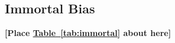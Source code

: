 \documentclass[11pt]{article}
\begin{document}
{\begin{comment}
By varying these parameters, the method computes bounds for the treatment effect and identifies breakdown point. 


\bigskip
\centerline{\bf [Place \hyperref[fig:dmp]{Figure~\ref*{fig:dmp}} about here]}
\bigskip

The point estimate is again -10.7\%. Panel (a) of \hyperref[fig:dmp]{Figure~\ref*{fig:dmp}} displays the bounds on the treatment effect over the maximum partial correlation parameter \( \bar{c} \). The bounds cross zero at \( \bar{r}_X = 27.7\% \) and remain robust across the full range of \( \bar{c} \), as evident in Panel (b). Recall that the observed covariates explain only 4.4\% of the variation in the treatment variable. This implies that unobserved variables would need to explain approximately six times more variation in treatment than the observed variables to overturn the negative treatment effect. 

\end{comment}

\subsection{Immortal Bias}

\bigskip
\centerline{\bf [Place \hyperref[tab:immortal]{Table~\ref*{tab:immortal}} about here]}
\bigskip



\clearpage


\begin{doublespacing}   %


\end{doublespacing}

\clearpage


\appendix


}
\end{document}
